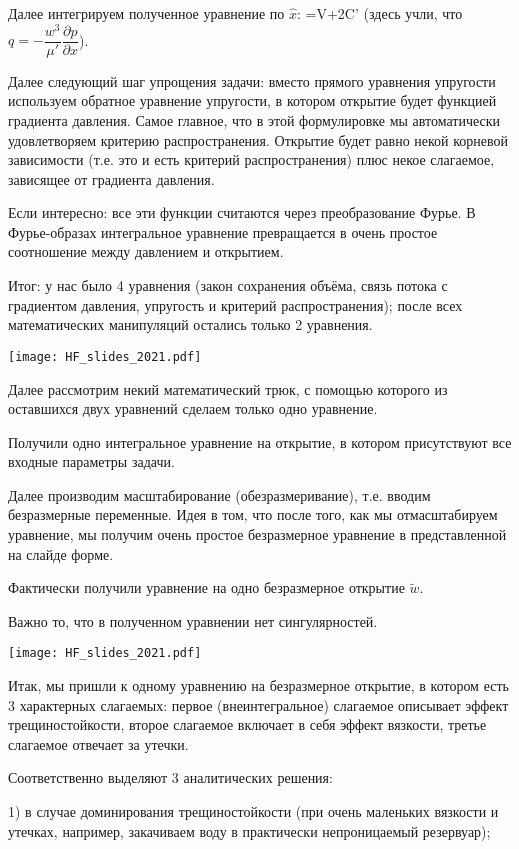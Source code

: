 \documentclass[main.tex]{subfiles}
\begin{document}
Далее интегрируем полученное уравнение по $\hat{x}$:
\beq
{}=V+2C'
\eeq
(здесь учли, что $q=-\dfrac{w^3}{\mu'}\dfrac{\partial p}{\partial x}$).

Далее следующий шаг упрощения задачи: вместо прямого уравнения упругости используем обратное уравнение упругости, в котором открытие будет функцией градиента давления.
Самое главное, что в этой формулировке мы автоматически удовлетворяем критерию распространения.
Открытие будет равно некой корневой зависимости (т.е. это и есть критерий распространения) плюс некое слагаемое, зависящее от градиента давления.

Если интересно: все эти функции считаются через преобразование Фурье.
В Фурье-образах интегральное уравнение превращается в очень простое соотношение между давлением и открытием.

Итог: у нас было 4 уравнения (закон сохранения объёма, связь потока с градиентом давления, упругость и критерий распространения); после всех математических манипуляций остались только 2 уравнения.

\texttt{[image: HF\_slides\_2021.pdf]}

Далее рассмотрим некий математический трюк, с помощью которого из оставшихся двух уравнений сделаем только одно уравнение.

Получили одно интегральное уравнение на открытие, в котором присутствуют все входные параметры задачи.

Далее производим масштабирование (обезразмеривание), т.е. вводим безразмерные переменные.
Идея в том, что после того, как мы отмасштабируем уравнение, мы получим очень простое безразмерное уравнение в представленной на слайде форме.

Фактически получили уравнение на одно безразмерное открытие $\tilde{w}$.

Важно то, что в полученном уравнении нет сингулярностей.

\texttt{[image: HF\_slides\_2021.pdf]}

Итак, мы пришли к одному уравнению на безразмерное открытие, в котором есть 3 характерных слагаемых: первое (внеинтегральное) слагаемое описывает эффект трещиностойкости, второе слагаемое включает в себя эффект вязкости, третье слагаемое отвечает за утечки.

Соответственно выделяют 3 аналитических решения:

1) в случае доминирования трещиностойкости (при очень маленьких вязкости и утечках, например, закачиваем воду в практически непроницаемый резервуар);
\end{document}
